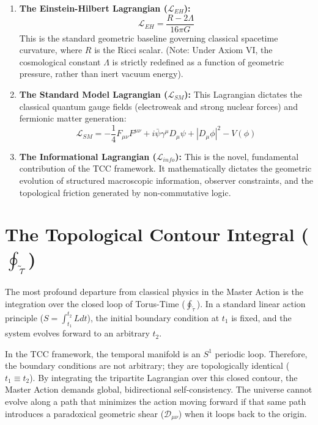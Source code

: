 \documentclass[12pt,openany]{book}
\theoremstyle{plain}
\theoremstyle{definition}
\theoremstyle{remark}
\begin{document}
\begin{enumerate}
    \item \textbf{The Einstein-Hilbert Lagrangian ($\mathcal{L}_{EH}$):}
    \begin{equation}
    \mathcal{L}_{EH} = \frac{R - 2\Lambda}{16\pi G}
    \end{equation}
    This is the standard geometric baseline governing classical spacetime curvature, where $R$ is the Ricci scalar. (Note: Under Axiom VI, the cosmological constant $\Lambda$ is strictly redefined as a function of geometric pressure, rather than inert vacuum energy).

    \item \textbf{The Standard Model Lagrangian ($\mathcal{L}_{SM}$):} This Lagrangian dictates the classical quantum gauge fields (electroweak and strong nuclear forces) and fermionic matter generation:
    \begin{equation}
    \mathcal{L}_{SM} = -\frac{1}{4}F_{\mu\nu}F^{\mu\nu} + i\bar{\psi}\gamma^\mu D_\mu \psi + |D_\mu \phi|^2 - V(\phi)
    \end{equation}

    \item \textbf{The Informational Lagrangian ($\mathcal{L}_{info}$):} This is the novel, fundamental contribution of the TCC framework. It mathematically dictates the geometric evolution of structured macroscopic information, observer constraints, and the topological friction generated by non-commutative logic.
\end{enumerate}

\section{The Topological Contour Integral ($\oint_{\tilde{\tau}}$)}

The most profound departure from classical physics in the Master Action is the integration over the closed loop of Torus-Time ($\oint_{\tilde{\tau}}$). In a standard linear action principle ($S = \int_{t_1}^{t_2} L dt$), the initial boundary condition at $t_1$ is fixed, and the system evolves forward to an arbitrary $t_2$. 

In the TCC framework, the temporal manifold is an $S^1$ periodic loop. Therefore, the boundary conditions are not arbitrary; they are topologically identical ($t_1 \equiv t_2$). By integrating the tripartite Lagrangian over this closed contour, the Master Action demands global, bidirectional self-consistency. The universe cannot evolve along a path that minimizes the action moving forward if that same path introduces a paradoxical geometric shear ($\mathcal{D}_{\mu\nu}$) when it loops back to the origin.
\end{document}
